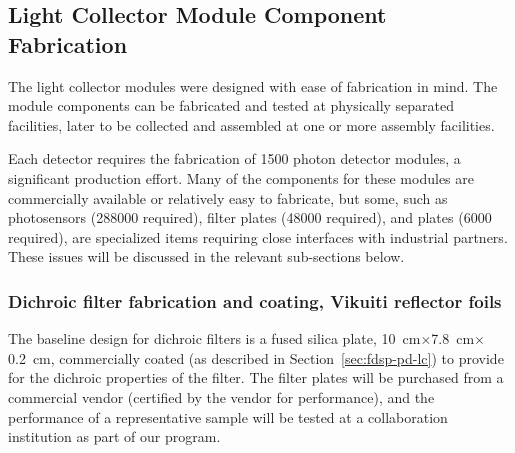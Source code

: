 
\subsection{Light Collector Module Component Fabrication}

The  light collector modules were designed with ease of fabrication in mind.  The module components can be fabricated and  tested at physically separated facilities, later to be collected and assembled at one or more assembly facilities.  %


Each  detector requires the fabrication of \num{1500} photon detector modules, a significant production effort.  Many of the components for these modules are commercially available or relatively easy to fabricate, but some, such as photosensors (\num{288000} required), filter plates (\num{48000} required), and  plates (\num{6000} required), are specialized items requiring close interfaces with industrial partners.  These issues will be discussed in the relevant sub-sections below.   

\subsubsection{Dichroic filter fabrication and coating, Vikuiti reflector foils}


The baseline design for dichroic filters is 
a fused silica plate,  \SI{10}{cm}$\times$\SI{7.8}{cm}$\times$\SI{0.2}{cm}, commercially coated (as described in Section~\ref{sec:fdsp-pd-lc}) to provide for the dichroic properties of the filter.  
The filter plates will be purchased from a commercial vendor (certified by the vendor for performance), and the performance of a representative sample will be tested at a collaboration institution as part of our  program.  

